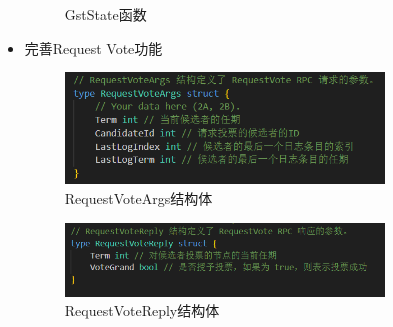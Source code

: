 \documentclass[]{article}
\begin{document}
\begin{itemize}
\begin{figure}[H]
			\caption{GstState函数}
		\end{figure}
		\item 完善Request Vote功能
		\begin{figure}[H]
			\centering
			\includegraphics[width=0.8\textwidth]{./2A/RequestVoteArgs.png}
			\caption{RequestVoteArgs结构体}
		\end{figure}
		\begin{figure}[H]
			\centering
			\includegraphics[width=0.8\textwidth]{./2A/RequestVoteReply.png}
			\caption{RequestVoteReply结构体}
		\end{figure}
		\begin{figure}[H]
			\centering

\end{figure}
\end{itemize}
\end{document}
